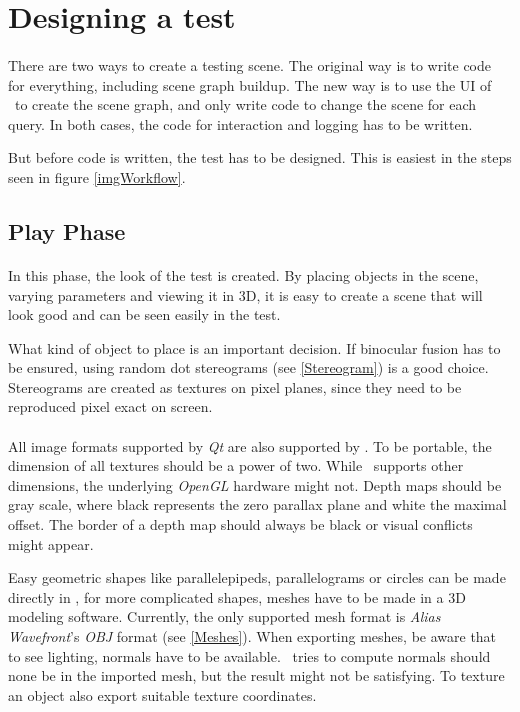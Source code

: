 \section{Designing a test\label{Making}}
\paragraph{}
There are two ways to create a testing scene.
The original way is to write code for everything, including scene graph buildup.
The new way is to use the UI of \ER\ to create the scene graph,
and only write code to change the scene for each query.
In both cases, the code for interaction and logging has to be written.

But before code is written, the test has to be designed.
This is easiest in the steps seen in figure \ref{imgWorkflow}.


\subsection{Play Phase}
\paragraph{}
In this phase, the look of the test is created.
By placing objects in the scene, varying parameters and viewing it in 3D, it is easy to create a scene that will look good and can be seen easily in the test.

What kind of object to place is an important decision.
If binocular fusion has to be ensured, using random dot stereograms (see \ref{Stereogram}) is a good choice.
Stereograms are created as textures on pixel planes, since they need to be reproduced pixel exact on screen.

\paragraph{}
All image formats supported by \textit{Qt} are also supported by \ER.
To be portable, the dimension of all textures should be a power of two.
While \ER\ supports other dimensions, the underlying \textit{OpenGL} hardware might not.
Depth maps should be gray scale, where black represents the zero parallax plane and white the maximal offset.
The border of a depth map should always be black or visual conflicts might appear.

Easy geometric shapes like parallelepipeds, parallelograms or circles can be made directly in \ER,
for more complicated shapes, meshes have to be made in a 3D modeling software.
Currently, the only supported mesh format is \textit{Alias Wavefront}'s \textit{OBJ} format (see \ref{Meshes}).
When exporting meshes, be aware that to see lighting, normals have to be available.
\ER\ tries to compute normals should none be in the imported mesh, but the result might not be satisfying.
To texture an object also export suitable texture coordinates.

